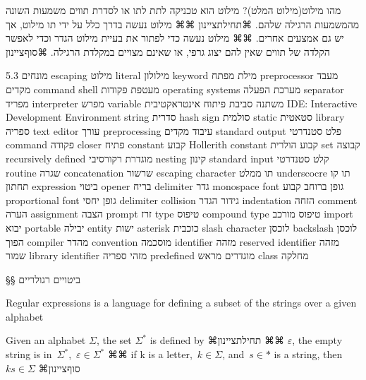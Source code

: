         מהו מילוט(מילוט המלט)?
        מילוט הוא טכניקה לתת לתו או לסדרת תווים משמעות השונה מהמשמעות הרגילה שלהם.
        ⌘תחילת{ציינון}
        ⌘⌘ מילוט נעשה בדרך כלל על ידי תו מילוט, אך יש גם אמצעים אחרים.
        ⌘⌘ מילוט נעשה כדי לפתור את בעיית מילוט הגדר וכדי לאפשר הקלדה של תווים שאין להם יצוג גרפי, או שאינם מצויים במקלדת הרגילה.
      ⌘סוף{ציינון}

        5.3 מונחים
        escaping מילוט
        literal מילולון
        keyword מילת מפתח
        preprocessor מעבד מקדים
        command shell מעטפת פקודות
        operating systems מערכת הפעלה
        separator מפריד
        interpreter מפרש
        variable משתנה
        סביבת פיתוח אינטראקטיבית
        IDE: Interactive Development Environment
        string סדרית
        hash sign סולמית
        static סטאטית
        library ספריה
        text editor עורך
        preprocessing עיבוד מקדים
        standard output פלט סטנדרטי
        command פקודה
        closer פתיח
        constant קבוע
        Hollerith constant קבוע הולרית
        set קבוצה
        recursively defined מוגדרת רקורסיבי
        nesting קינון
        standard input קלט סטנדרטי
        routine שגרה
        concatenation שרשור
        escaping character תו ממלט
        underscocre תו קו תחתון
        expression ביטוי
        opener בריח
        delimiter גדר
        monospace font גופן ברוחב קבוע
        proportional font גופן יחסי
        delimiter collision גידור הגדר
        indentation הזחה
        comment הערה
        assignment הצבה
        prompt זרז
        type טיפוס
        compound type טיפוס מורכב
        import יבוא
        portable יבילה
        entity ישות
        asterisk כוכבית
        slash character לוכסן
        backslash לוכסן הפוך
        compiler מהדר
        convention מוסכמה
        identifier מזהה
        reserved identifier מזהה שמור
        library identifier מזהי ספריה
        predefined מוגדרים מראש
        class מחלקה

§§ ביטויים רגולריים

        Regular expressions is a language for defining a subset of the strings
        over a given alphabet

        Given an alphabet $Σ$, the set $\Sigma^*$ is defined by
            ⌘תחילת{ציינון}
          ⌘⌘ $ε$, the empty string is in~$\Sigma ^*$,~$ε∈Σ^*$
          ⌘⌘ if k is a letter,~$k ∈ Σ$, and~$s ∈ *$ is a string, then~$ks ∈ Σ$
        ⌘סוף{ציינון}

